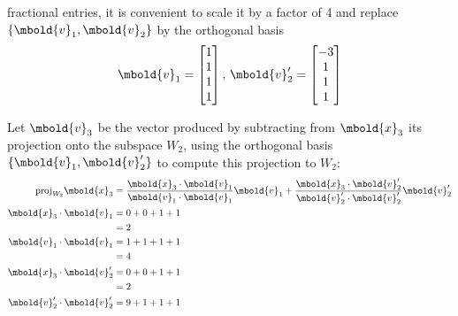 \documentclass[12pt letter]{report}
\begin{document}
{{\begin{description}
            fractional entries, it is convenient to scale it by a factor of 4 and replace $\{\mbold{v}_1,
              \mbold{v}_2\} $ by the orthogonal basis
            \[
              \mbold{v}_1 = \begin{bmatrix} 1 \\ 1\\ 1\\ 1 \end{bmatrix},\, \mbold{v}^{\prime}_2 = \begin{bmatrix}
                -3 \\ 1\\ 1\\ 1 \end{bmatrix}
            \]
      \item [Step 3] Let $\mbold{v}_3$ be the vector produced by subtracting from $\mbold{x}_3$  its projection
            onto the subspace $W_2$, using the orthogonal basis $\{\mbold{v}_1, \mbold{v}^{\prime}_2\} $ to compute this
            projection to $W_2$:
            \begin{align*}
              \text{proj}_{W_2} \mbold{x}_3                    & = \frac{\mbold{x}_3 \cdot \mbold{v}_1}{\mbold{v}_1\cdot
                \mbold{v}_1}\mbold{v}_1 +
              \frac{\mbold{x}_3 \cdot \mbold{v}^{\prime}_2}{\mbold{v}^{\prime}_2 \cdot
              \mbold{v}^{\prime}_2}\mbold{v}^{\prime}_2                                                                            \\
              \mbold{x}_3 \cdot \mbold{v}_1                    & = 0 + 0 + 1 + 1                                                   \\
                                                               & = 2                                                               \\
              \mbold{v}_1 \cdot \mbold{v}_1                    & = 1 + 1+ 1+1                                                      \\
                                                               & = 4                                                               \\
              \mbold{x}_3 \cdot \mbold{v}^{\prime}_2           & = 0 + 0 + 1 + 1                                                   \\
                                                               & = 2                                                               \\
              \mbold{v}^{\prime}_2\cdot   \mbold{v}^{\prime}_2 & =9 + 1 + 1 + 1                                                    \\

\end{align*}
\end{description}}}
\end{document}
